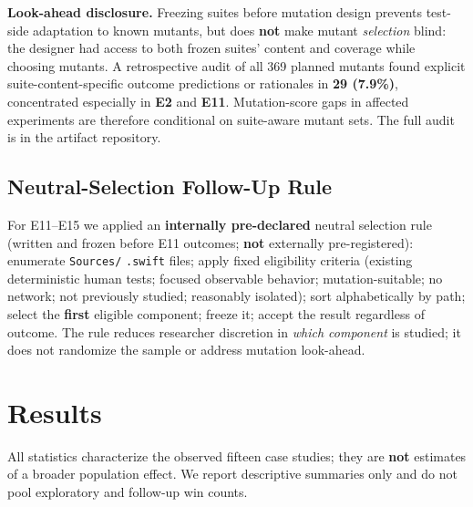 \documentclass[10pt,conference,a4paper]{IEEEtran}
\begin{document}
\textbf{Look-ahead disclosure.} Freezing suites before mutation design prevents test-side adaptation to known mutants, but does \textbf{not} make mutant \emph{selection} blind: the designer had access to both frozen suites' content and coverage while choosing mutants. A retrospective audit of all 369 planned mutants found explicit suite-content-specific outcome predictions or rationales in \textbf{29 (7.9\%)}, concentrated especially in \textbf{E2} and \textbf{E11}. Mutation-score gaps in affected experiments are therefore conditional on suite-aware mutant sets. The full audit is in the artifact repository.

\subsection{Neutral-Selection Follow-Up Rule}
For E11--E15 we applied an \textbf{internally pre-declared} neutral selection rule (written and frozen before E11 outcomes; \textbf{not} externally pre-registered): enumerate \texttt{Sources/} \texttt{.swift} files; apply fixed eligibility criteria (existing deterministic human tests; focused observable behavior; mutation-suitable; no network; not previously studied; reasonably isolated); sort alphabetically by path; select the \textbf{first} eligible component; freeze it; accept the result regardless of outcome. The rule reduces researcher discretion in \emph{which component} is studied; it does not randomize the sample or address mutation look-ahead.

\section{Results}
All statistics characterize the observed fifteen case studies; they are \textbf{not} estimates of a broader population effect. We report descriptive summaries only and do not pool exploratory and follow-up win counts.
\end{document}
